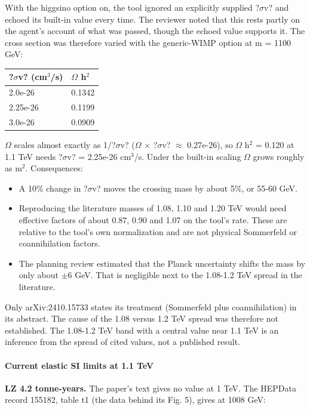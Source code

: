\documentclass[11pt,a4paper]{article}
\begin{document}
With the higgsino option on, the tool ignored an explicitly supplied ?$\sigma$v? and echoed its built-in value every time. The reviewer noted that this rests partly on the agent's account of what was passed, though the echoed value supports it. The cross section was therefore varied with the generic-WIMP option at m = 1100 GeV:

\begin{longtable}{@{}p{}p{}@{}}
\toprule
\textbf{?$\sigma$v? (cm$^3$/s)} & \textbf{$\Omega$ h$^2$} \\ \midrule \endhead
2.0e-26 & 0.1342 \\
2.25e-26 & 0.1199 \\
3.0e-26 & 0.0909 \\
\bottomrule\end{longtable}
$\Omega$ scales almost exactly as 1/?$\sigma$v? ($\Omega$ $\times$ ?$\sigma$v? $\approx$ 0.27e-26), so $\Omega$ h$^2$ = 0.120 at 1.1 TeV needs ?$\sigma$v? = 2.25e-26 cm$^3$/s. Under the built-in scaling $\Omega$ grows roughly as m$^2$. Consequences:

\begin{itemize}
  \item A 10\% change in ?$\sigma$v? moves the crossing mass by about 5\%, or 55-60 GeV.
  \item Reproducing the literature masses of 1.08, 1.10 and 1.20 TeV would need effective factors of about 0.87, 0.90 and 1.07 on the tool's rate. These are relative to the tool's own normalization and are not physical Sommerfeld or coannihilation factors.
  \item The planning review estimated that the Planck uncertainty shifts the mass by only about $\pm$6 GeV. That is negligible next to the 1.08-1.2 TeV spread in the literature.
\end{itemize}
Only arXiv:2410.15733 states its treatment (Sommerfeld plus coannihilation) in its abstract. The cause of the 1.08 versus 1.2 TeV spread was therefore not established. The 1.08-1.2 TeV band with a central value near 1.1 TeV is an inference from the spread of cited values, not a published result.

\paragraph{Current elastic SI limits at 1.1 TeV}
\textbf{LZ 4.2 tonne-years.} The paper's text gives no value at 1 TeV. The HEPData record 155182, table t1 (the data behind its Fig. 5), gives at 1008 GeV:
\end{document}
